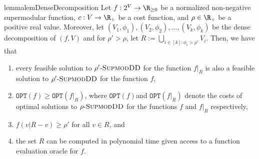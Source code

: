 \documentclass{article}
\newcommand{\OPT}{\ensuremath{\mathtt{OPT}}\xspace}
\newcommand{\sdds}{\ensuremath{\textsc{SupmodDD}}\xspace}
\newcommand{\rhosdds}[1]{\ensuremath{#1\text{-}\sdds}}
\begin{document}
\begin{restatable}{lemma}{lemDenseDecomposition}\label{lem:dense-decomposition}
    Let $f:2^V\rightarrow\R_{\geq 0}$ be a  normalized non-negative supermodular function, $c:V\rightarrow\R_{+}$ be a cost function,  and $\rho \in \R_+$ be a positive real value. Moreover, let $(V_1, \phi_1), (V_2, \phi_2), \ldots, (V_k, \phi_k)$ be the dense decomposition of $(f, V)$ and for $\rho'>\rho$, let $R := \bigcup_{i \in [k] : \phi_i > \rho'}V_i$. Then, we have that 
    \begin{enumerate}
        \item every feasible solution to \rhosdds{\rho'} for the function $f|_R$ is also a feasible solution to \rhosdds{\rho'} for the function  $f$,
        \item $\OPT(f) \geq  \OPT(f|_R)$,
where $\OPT(f)$and $ \OPT(f|_R)$ denote the costs of optimal solutions to $\rhosdds{\rho}$ for the functions $f$ and $f|_R$ respectively,
        \item $f(v|R-v) \geq \rho'$ for all $v \in R$, and  
        \item the set $R$ can be computed in polynomial time given access to a function evaluation oracle for $f$.
    \end{enumerate}
\end{restatable}
\end{document}
